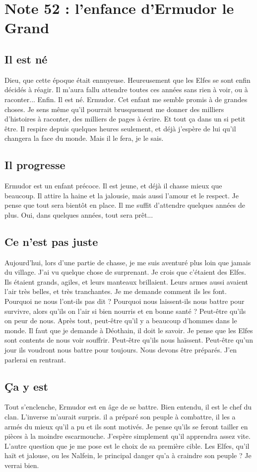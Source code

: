 \section{Note 52 : l'enfance d'Ermudor le Grand}
\subsection{Il est né}
Dieu, que cette époque était ennuyeuse. Heureusement que les Elfes se sont enfin décidés à réagir. Il m'aura fallu attendre toutes ces années sans rien à voir, ou à raconter... Enfin. Il est né. Ermudor. Cet enfant me semble promis à de grandes choses. Je sens même qu'il pourrait brusquement me donner des milliers d'histoires à raconter, des milliers de pages à écrire. Et tout ça dans un si petit être. Il respire depuis quelques heures seulement, et déjà j'espère de lui qu'il changera la face du monde. Mais il le fera, je le sais.

\subsection{Il progresse}
Ermudor est un enfant précoce. Il est jeune, et déjà il chasse mieux que beaucoup. Il attire la haine et la jalousie, mais aussi l'amour et le respect. Je pense que tout sera bientôt en place. Il me suffit d'attendre quelques années de plus. Oui, dans quelques années, tout sera prêt...

\subsection{Ce n'est pas juste}
Aujourd'hui, lors d'une partie de chasse, je me suis aventuré plus loin que jamais du village. J'ai vu quelque chose de surprenant. Je crois que c'étaient des Elfes. Ils étaient grands, agiles, et leurs manteaux brillaient. Leurs armes aussi avaient l'air très belles, et très tranchantes. Je me demande comment ils les font. Pourquoi ne nous l'ont-ils pas dit ? Pourquoi nous laissent-ils nous battre pour survivre, alors qu'ils on l'air si bien nourris et en bonne santé ? Peut-être qu'ils on peur de nous. Après tout, peut-être qu'il y a beaucoup d'hommes dans le monde. Il faut que je demande à Déothain, il doit le savoir. Je pense que les Elfes sont contents de nous voir souffrir. Peut-être qu'ils nous haïssent. Peut-être qu'un jour ils voudront nous battre pour toujours. Nous devons être préparés. J'en parlerai en rentrant.

\subsection{Ça y est}
Tout s'enclenche, Ermudor est en âge de se battre. Bien entendu, il est le chef du clan. L'inverse m'aurait surpris. il a préparé son peuple à combattre, il les a armés du mieux qu'il a pu et ils sont motivés. Je pense qu'ils se feront tailler en pièces à la moindre escarmouche. J'espère simplement qu'il apprendra assez vite. L'autre question que je me pose est le choix de sa première cible. Les Elfes, qu'il haït et jalouse, ou les Nalfein, le principal danger qu'a à craindre son peuple ? Je verrai bien.